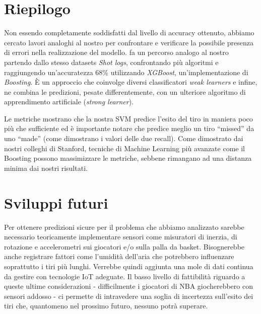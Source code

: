 \section{Riepilogo}

\par
Non essendo completamente soddisfatti dal livello di accuracy ottenuto, abbiamo cercato lavori analoghi al nostro per confrontare e verificare la possibile presenza di errori nella realizzazione del modello. \cite{predictingNBAst} fa un percorso analogo al nostro partendo dallo stesso datasets \textit{Shot logs}, confrontando più algoritmi e raggiungendo un'accuratezza  68\% utilizzando \textit{XGBoost}, un'implementazione di \textit{Boosting}. È un approccio che coinvolge diversi classificatori \textit{weak learners} e infine, ne combina le predizioni, pesate differentemente, con un ulteriore algoritmo di apprendimento artificiale (\textit{strong learner}).

Le metriche mostrano che la nostra SVM predice l'esito del tiro in maniera poco più che sufficiente ed è importante notare che predice meglio un tiro “missed” da uno “made” (come dimostrano i valori delle due recall).
Come dimostrato dai nostri colleghi di Stanford, tecniche di Machine Learning più avanzate come il Boosting possono massimizzare le metriche, sebbene rimangano ad una distanza minima dai nostri risultati.

\section{Sviluppi futuri}
Per ottenere predizioni sicure per il problema che abbiamo analizzato sarebbe necessario teoricamente implementare sensori come misuratori di inerzia, di rotazione e accelerometri sui giocatori e/o sulla palla da basket. Bisognerebbe anche registrare fattori come l'umidità dell'aria che potrebbero influenzare soprattutto i tiri più lunghi. Verrebbe quindi aggiunta una mole di dati continua da gestire con tecnologie IoT adeguate. Il basso livello di fattibilità riguardo a queste ultime considerazioni - difficilmente i giocatori di NBA giocherebbero con sensori addosso - ci permette di intravedere una soglia di incertezza sull'esito dei tiri che, quantomeno nel prossimo futuro, nessuno potrà superare.

